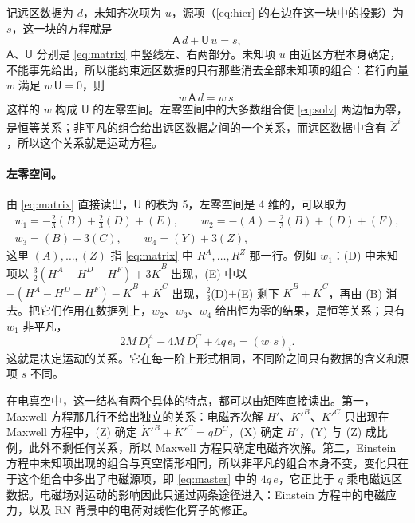 \documentclass[11pt,a4paper]{ctexart}
\begin{document}
记远区数据为 $d$，未知齐次项为 $u$，源项（\eqref{eq:hier} 的右边在这一块中的投影）为 $s$，这一块的方程就是
\begin{equation}
\mathsf A\,d+\mathsf U\,u=s,
\label{eq:matrixform}
\end{equation}
$\mathsf A$、$\mathsf U$ 分别是 \eqref{eq:matrix} 中竖线左、右两部分。未知项 $u$ 由近区方程本身确定，不能事先给出，所以能约束远区数据的只有那些消去全部未知项的组合：若行向量 $w$ 满足 $w\,\mathsf U=0$，则
\begin{equation}
w\,\mathsf A\,d=w\,s.
\label{eq:solv}
\end{equation}
这样的 $w$ 构成 $\mathsf U$ 的左零空间。左零空间中的大多数组合使 \eqref{eq:solv} 两边恒为零，是恒等关系；非平凡的组合给出远区数据之间的一个关系，而远区数据中含有 $\ddot Z^i$，所以这个关系就是运动方程。

\paragraph{左零空间。}由 \eqref{eq:matrix} 直接读出，$\mathsf U$ 的秩为 5，左零空间是 4 维的，可以取为
\begin{gather}
w_1=-\tfrac23(B)+\tfrac23(D)+(E),\qquad
w_2=-(A)-\tfrac23(B)+(D)+(F),\\
w_3=(B)+3(C),\qquad
w_4=(Y)+3(Z),
\end{gather}
这里 $(A),\dots,(Z)$ 指 \eqref{eq:matrix} 中 $R^A,\dots,R^Z$ 那一行。例如 $w_1$：(D) 中未知项以 $\tfrac32(H^A-H^D-H^F)+3\dot K^B$ 出现，(E) 中以 $-(H^A-H^D-H^F)-\dot K^B+\dot K^C$ 出现，$\tfrac23$(D)$+$(E) 剩下 $\dot K^B+\dot K^C$，再由 (B) 消去。把它们作用在数据列上，$w_2$、$w_3$、$w_4$ 给出恒为零的结果，是恒等关系；只有 $w_1$ 非平凡，
\begin{equation}
2M\,D^A_i-4M\,D^C_i+4q\,e_i=(w_1s)_i .
\label{eq:master}
\end{equation}
这就是决定运动的关系。它在每一阶上形式相同，不同阶之间只有数据的含义和源项 $s$ 不同。

在电真空中，这一结构有两个具体的特点，都可以由矩阵直接读出。第一，Maxwell 方程那几行不给出独立的关系：电磁齐次解 $H'$、$\dot K'^B$、$\dot K'^C$ 只出现在 Maxwell 方程中，(Z) 确定 $\dot K'^B+\dot K'^C=qD^C$，(X) 确定 $H'$，(Y) 与 (Z) 成比例，此外不剩任何关系，所以 Maxwell 方程只确定电磁齐次解。第二，Einstein 方程中未知项出现的组合与真空情形相同，所以非平凡的组合本身不变，变化只在于这个组合中多出了电磁源项，即 \eqref{eq:master} 中的 $4q\,e$，它正比于 $q$ 乘电磁远区数据。电磁场对运动的影响因此只通过两条途径进入：Einstein 方程中的电磁应力，以及 RN 背景中的电荷对线性化算子的修正。
\end{document}
